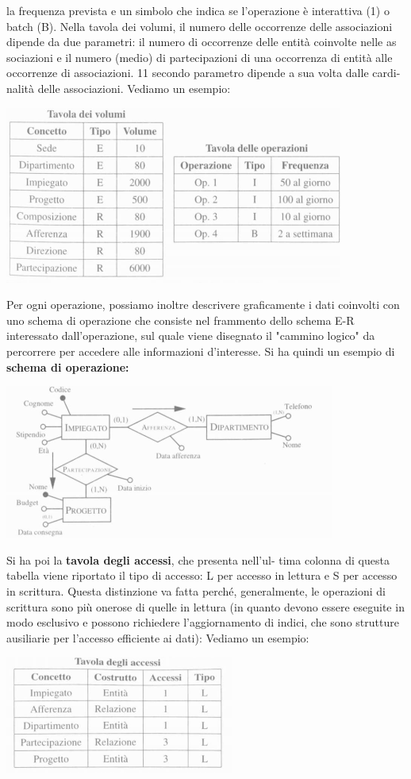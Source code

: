 \documentclass[a4paper,12pt, oneside]{book}
\begin{document}
la frequenza prevista e un simbolo che indica se l'operazione è interattiva (1) o
batch (B). Nella tavola dei volumi, il numero delle occorrenze delle associazioni
dipende da due parametri: il numero di occorrenze delle entità coinvolte nelle as
sociazioni e il numero (medio) di partecipazioni di una occorrenza di entità alle
occorrenze di associazioni. 11 secondo parametro dipende a sua volta dalle cardi-
nalità delle associazioni. Vediamo un esempio:
\begin{center}
\includegraphics[scale=0.9]{img/tav.png}
\end{center}
Per ogni operazione, possiamo inoltre descrivere graficamente i dati coinvolti
con uno schema di operazione che consiste nel frammento dello schema E-R
interessato dall'operazione, sul quale viene disegnato il "cammino logico" da
percorrere per accedere alle informazioni d'interesse. Si ha quindi un esempio
di \textbf{schema di operazione:}
\begin{center}
\includegraphics[scale=0.9]{img/opt.png}
\end{center}
Si ha poi la \textbf{tavola degli accessi}, che presenta nell'ul-
tima colonna di questa tabella viene riportato il tipo di accesso: L per accesso in
lettura e S per accesso in scrittura. Questa distinzione va fatta perché, generalmente, le operazioni di scrittura sono più onerose di quelle in lettura (in quanto
devono essere eseguite in modo esclusivo e possono richiedere l'aggiornamento di
indici, che sono strutture ausiliarie per l'accesso efficiente ai dati): Vediamo un esempio:
\begin{center}
\includegraphics[scale=1]{img/ac.png}
\end{center}
\newpage
\end{document}
